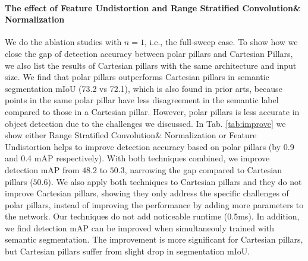 \documentclass{article}
\begin{document}
 \paragraph{The effect of Feature Undistortion and Range Stratified Convolution\& Normalization} 
 We do the ablation studies with $n=1$, i.e., the full-sweep case. To show how we close the gap of detection accuracy between polar pillars and Cartesian Pillars, we also list the results of Cartesian pillars with the same architecture and input size. We find that polar pillars outperforms Cartesian pillars in semantic segmentation mIoU (73.2 vs 72.1), which is also found in prior arts\cite{zhang2020polarnet}, because points in the same polar pillar have less disagreement in the semantic label compared to those in a Cartesian pillar. However, polar pillars is less accurate in object detection due to the challenges we discussed. In Tab. \ref{tab:improve} we show either Range Stratified Convolution\& Normalization or Feature Undistortion helps to improve detection accuracy based on polar pillars (by 0.9 and 0.4 mAP respectively). With both techniques combined, we improve detection mAP from $48.2$ to $50.3$, narrowing the gap compared to Cartesian pillars ($50.6$). We also apply both techniques to Cartesian pillars and they do not improve Cartesian pillars, showing they only address the specific challenges of polar pillars, instead of improving the performance by adding more parameters to the network. Our techniques do not add noticeable runtime (0.5ms). In addition, we find detection mAP can be improved when simultaneouly trained with semantic segmentation. The improvement is more significant for Cartesian pillars, but Cartesian pillars suffer from slight drop in segmentation mIoU.
\begin{table*}[h]
  \caption{Ablation Studies on the validation split of nuScenes.}
  \label{tab:improve}
  \centering
\end{table*}
\end{document}
